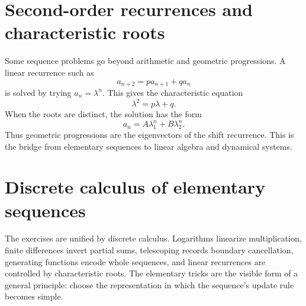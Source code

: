 \section{Second-order recurrences and characteristic roots}

Some sequence problems go beyond arithmetic and geometric progressions.  A linear recurrence such as
\[
  a_{n+2}=pa_{n+1}+qa_n
\]
is solved by trying \(a_n=\lambda^n\).  This gives the characteristic equation
\[
  \lambda^2=p\lambda+q.
\]
When the roots are distinct, the solution has the form
\[
  a_n=A\lambda_1^n+B\lambda_2^n.
\]
Thus geometric progressions are the eigenvectors of the shift recurrence.  This is the bridge from elementary sequences to linear algebra and dynamical systems.

\section{Discrete calculus of elementary sequences}

The exercises are unified by discrete calculus.  Logarithms linearize multiplication, finite differences invert partial sums, telescoping records boundary cancellation, generating functions encode whole sequences, and linear recurrences are controlled by characteristic roots.  The elementary tricks are the visible form of a general principle: choose the representation in which the sequence's update rule becomes simple.
